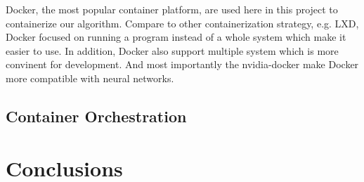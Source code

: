 \documentclass[runningheads]{llncs}
\begin{document}
Docker, the most popular container platform, are used here 
in this project to containerize our algorithm. Compare to 
other containerization strategy, e.g. LXD, Docker focused 
on running a program instead of a whole system which make 
it easier to use. In addition, Docker also support multiple 
system which is more convinent for development. And most 
importantly the nvidia-docker make Docker more compatible 
with neural networks.

\subsection{Container Orchestration}


\section{Conclusions}


\clearpage



\end{document}

